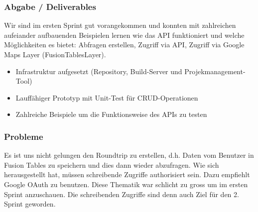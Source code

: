 \subsubsection{Abgabe / Deliverables}
Wir sind im ersten Sprint gut vorangekommen und konnten mit zahlreichen aufeiander aufbauenden Beispielen lernen wie das API funktioniert und welche Möglichkeiten es bietet: Abfragen erstellen, Zugriff via API, Zugriff via Google Maps Layer (FusionTablesLayer).

\begin{itemize}
	\item Infrastruktur aufgesetzt (Repository, Build-Server und Projekmanagement-Tool)
	\item Lauffähiger Prototyp mit Unit-Test für CRUD-Operationen
	\item Zahlreiche Beispiele um die Funktionsweise des APIs zu testen
\end{itemize}

\subsubsection{Probleme}
Es ist uns nicht gelungen den Roundtrip zu erstellen, d.h. Daten vom Benutzer in Fusion Tables zu speichern und dies dann wieder abzufragen. Wie sich herausgestellt hat, müssen schreibende Zugriffe authorisiert sein. Dazu empfiehlt Google OAuth zu benutzen. Diese Thematik war schlicht zu gross um im ersten Sprint anzuschauen. Die schreibenden Zugriffe sind denn auch Ziel für den 2. Sprint geworden. 